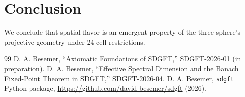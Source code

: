 \documentclass[amsmath,amssymb,aps,prd,twocolumn,superscriptaddress,nofootinbib]{revtex4-2}
\begin{document}
\section{Conclusion}
We conclude that spatial flavor is an emergent property of the three-sphere's projective geometry under 24-cell restrictions.



\begin{thebibliography}{99}
 D. A. Besemer, ``Axiomatic Foundations of SDGFT,'' SDGFT-2026-01 (in preparation).
 D. A. Besemer, ``Effective Spectral Dimension and the Banach Fixed-Point Theorem in SDGFT,'' SDGFT-2026-04.
 D. A. Besemer, \texttt{sdgft} Python package, \url{https://github.com/david-besemer/sdgft} (2026).
\end{thebibliography}
\end{document}

